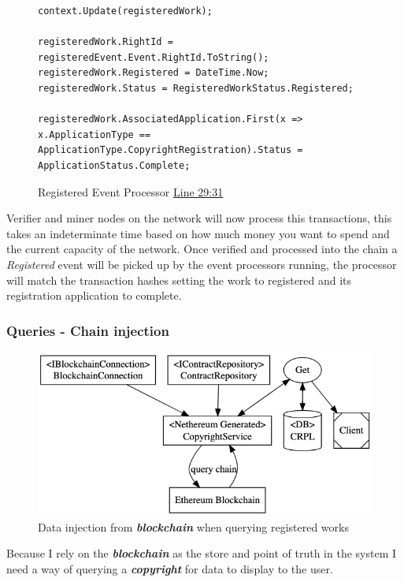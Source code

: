 \documentclass[12pt]{article}
\newcommand{\keyword}[1]{\textbf{\textit{#1}}}
\begin{document}
\begin{figure}[H]
\caption{Registered Event Processor \href{https://github.com/MrHarrisonBarker/CRPL/blob/main/CRPL.Web/Core/EventProcessors/RegisteredEventProcessor.cs}{Line 29:31}}
\centering
\begin{lstlisting}[language=CSharp]
context.Update(registeredWork);

registeredWork.RightId = registeredEvent.Event.RightId.ToString();
registeredWork.Registered = DateTime.Now;
registeredWork.Status = RegisteredWorkStatus.Registered;

registeredWork.AssociatedApplication.First(x => x.ApplicationType == ApplicationType.CopyrightRegistration).Status = ApplicationStatus.Complete;	
\end{lstlisting}
\end{figure}

Verifier and miner nodes on the network will now process this transactions, this takes an indeterminate time based on how much money you want to spend and the current capacity of the network. Once verified and processed into the chain a \textit{Registered} event will be picked up by the event processors running, the processor will match the transaction hashes setting the work to registered and its registration application to complete.

\subsubsection{Queries - Chain injection}

\begin{figure}[H]
\caption{Data injection from \keyword{blockchain} when querying registered works}
\centering
\includegraphics[width=\textwidth,height=\textheight,keepaspectratio]{images/operational/chain-inject}
\end{figure}

Because I rely on the \keyword{blockchain} as the store and point of truth in the system I need a way of querying a \keyword{copyright} for data to display to the user. 
\end{document}
